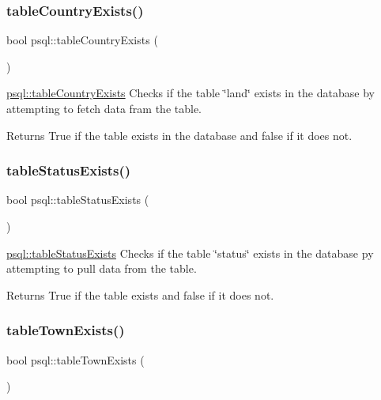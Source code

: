 \subsubsection{\texorpdfstring{table\+Country\+Exists()}{tableCountryExists()}}
{\footnotesize\ttfamily bool psql\+::table\+Country\+Exists (\begin{DoxyParamCaption}{ }\end{DoxyParamCaption})}



\mbox{\hyperlink{classpsql_ae0ab0012c58471bd3fd63c286fb22224}{psql\+::table\+Country\+Exists}} Checks if the table \char`\"{}land\char`\"{} exists in the database by attempting to fetch data fram the table. 

\begin{DoxyReturn}{Returns}
True if the table exists in the database and false if it does not. 
\end{DoxyReturn}
\mbox{\label{classpsql_a3f8bac89bd0cee3af77e47e5c555543d}} 
\subsubsection{\texorpdfstring{table\+Status\+Exists()}{tableStatusExists()}}
{\footnotesize\ttfamily bool psql\+::table\+Status\+Exists (\begin{DoxyParamCaption}{ }\end{DoxyParamCaption})}



\mbox{\hyperlink{classpsql_a3f8bac89bd0cee3af77e47e5c555543d}{psql\+::table\+Status\+Exists}} Checks if the table \char`\"{}status\char`\"{} exists in the database py attempting to pull data from the table. 

\begin{DoxyReturn}{Returns}
True if the table exists and false if it does not. 
\end{DoxyReturn}
\mbox{\label{classpsql_a717162b7d7faa0fb41b5a526e42de4ac}} 
\subsubsection{\texorpdfstring{table\+Town\+Exists()}{tableTownExists()}}
{\footnotesize\ttfamily bool psql\+::table\+Town\+Exists (\begin{DoxyParamCaption}{ }\end{DoxyParamCaption})}



